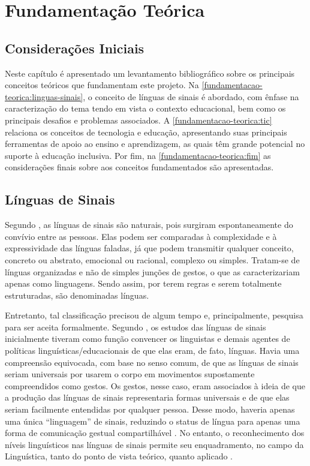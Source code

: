 \chapter{Fundamentação Teórica}
\label{chapter:fundamentacao-teorica}

\section{Considerações Iniciais}
\label{fundamentacao-teorica:inicio}

Neste capítulo é apresentado um levantamento bibliográfico sobre os principais conceitos teóricos que fundamentam este projeto. Na \autoref{fundamentacao-teorica:linguas-sinais}, o conceito de línguas de sinais é abordado, com ênfase na caracterização do tema tendo em vista o contexto educacional, bem como os principais desafios e problemas associados. A \autoref{fundamentacao-teorica:tic} relaciona os conceitos de tecnologia e educação, apresentando suas principais ferramentas de apoio ao ensino e aprendizagem, as quais têm grande potencial no suporte à educação inclusiva. Por fim, na \autoref{fundamentacao-teorica:fim} as considerações finais sobre aos conceitos fundamentados são apresentadas.

\section{Línguas de Sinais}
\label{fundamentacao-teorica:linguas-sinais}

Segundo , as línguas de sinais são naturais, pois surgiram espontaneamente do convívio entre as pessoas. Elas podem ser comparadas à complexidade e à expressividade das línguas faladas, já que podem transmitir qualquer conceito, concreto ou abstrato, emocional ou racional, complexo ou simples. Tratam-se de línguas organizadas e não de simples junções de gestos, o que as caracterizariam apenas como linguagens. Sendo assim, por terem regras e serem totalmente estruturadas, são denominadas línguas.

Entretanto, tal classificação precisou de algum tempo e, principalmente, pesquisa para ser aceita formalmente. Segundo , os estudos das línguas de sinais inicialmente tiveram como função convencer os linguistas e demais agentes de políticas linguísticas/educacionais de que elas eram, de fato, línguas. Havia uma compreensão equivocada, com base no senso comum, de que as línguas de sinais seriam universais por usarem o corpo em movimentos supostamente compreendidos como gestos. Os gestos, nesse caso, eram associados à ideia de que a produção das línguas de sinais representaria formas universais e de que elas seriam facilmente entendidas por qualquer pessoa. Desse modo, haveria apenas uma única ``linguagem'' de sinais, reduzindo o status de língua para apenas uma forma de comunicação gestual compartilhável \cite{Quadros2004}. No entanto, o reconhecimento dos níveis linguísticos nas línguas de sinais permite seu enquadramento, no campo da Linguística, tanto do ponto de vista teórico, quanto aplicado \cite{Quadros2019}.

